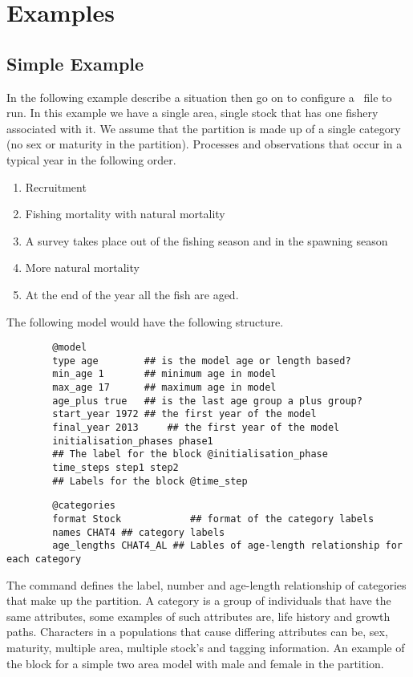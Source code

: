 \section{Examples}\label{Sec:examples}

\subsection{Simple Example}\label{Sec:simp}
In the following example describe a situation then go on to configure a \CNAME\ file to run. In this example we have a single area, single stock that has one fishery associated with it. We assume that the partition is made up of a single category (no sex or maturity in the partition). Processes and observations that occur in a typical year in the following order. \\
\begin{enumerate}
	\item Recruitment
	\item Fishing mortality with natural mortality
	\item A survey takes place out of the fishing season and in the spawning season
	\item More natural mortality
	\item At the end of the year all the fish are aged.
\end{enumerate}

The following model would have the following structure.

{\small{\begin{verbatim}
		@model
		type age		## is the model age or length based?
		min_age 1		## minimum age in model
		max_age 17		## maximum age in model
		age_plus true	## is the last age group a plus group?
		start_year 1972	## the first year of the model
		final_year 2013 	## the first year of the model
		initialisation_phases phase1	
		## The label for the block @initialisation_phase
		time_steps step1 step2
		## Labels for the block @time_step
		\end{verbatim}}}



{\small{\begin{verbatim}
		@categories
		format Stock			## format of the category labels
		names CHAT4 ## category labels
		age_lengths CHAT4_AL ## Lables of age-length relationship for each category
		\end{verbatim}}}


The  command defines the label, number and age-length relationship of categories that make up the partition. A category is a group of individuals that have the same attributes, some examples of such attributes are, life history and growth paths. Characters in a populations that cause differing attributes can be, sex, maturity, multiple area, multiple stock's and tagging information. An example of the  block for a simple two area model with male and female in the partition.


